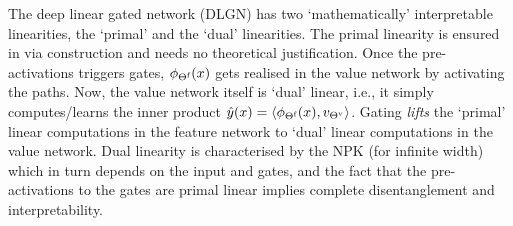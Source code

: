 The deep linear gated network (DLGN) has two `mathematically' interpretable linearities, the `primal' and the `dual' linearities. The primal linearity is ensured in via construction and needs no theoretical justification. Once the pre-activations triggers gates, $\phi_{\Theta^{\textrm{f}}}(x)$ gets realised in the value network by activating the paths.  Now, the value network itself is `dual' linear, i.e., it simply computes/learns the inner product $\hat{y}(x)=\langle \phi_{\Theta^{\textrm{f}}}(x),v_{{\Theta}^{\text{v}}}\rangle$. Gating \emph{lifts} the `primal' linear computations in the feature network to `dual' linear computations in the value network. Dual linearity is characterised by the NPK (for infinite width) which in turn depends on the input and gates, and  the fact that the pre-activations to the gates are primal linear implies complete disentanglement and interpretability. 

